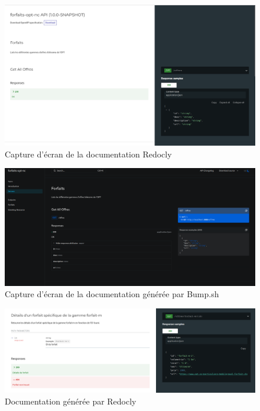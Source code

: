 \documentclass{article}
\begin{document}
	\begin{figure}[H]
		\centering
		\includegraphics[width=\textwidth]{asset/redocly.png}
		\caption{Capture d'écran de la documentation Redocly}
		\label{fig:html_redocly}
	\end{figure}
	\begin{figure}[H]
		\centering
		\includegraphics[width=\textwidth]{asset/bump-sh-documentation.png}
		\caption{Capture d'écran de la documentation générée par Bump.sh}
		\label{fig:bumpsh}
	\end{figure}
	\begin{figure}[H]
		\centering
		\includegraphics[width=\textwidth]{asset/Redocly_v2.png}
		\caption{Documentation générée par Redocly}
		\label{fig:redocly}
	\end{figure}
\end{document}

